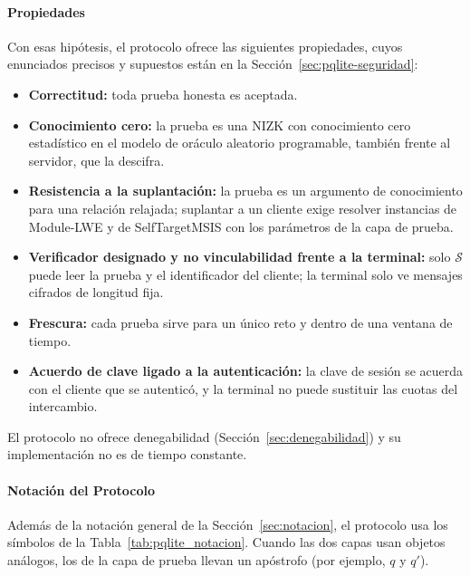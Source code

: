 \paragraph{Propiedades}

Con esas hipótesis, el protocolo ofrece las siguientes propiedades, cuyos enunciados precisos y supuestos están en la Sección~\ref{sec:pqlite-seguridad}:
\begin{itemize}
    \item \textbf{Correctitud:} toda prueba honesta es aceptada.
    \item \textbf{Conocimiento cero:} la prueba es una NIZK con conocimiento cero estadístico en el modelo de oráculo aleatorio programable, también frente al servidor, que la descifra.
    \item \textbf{Resistencia a la suplantación:} la prueba es un argumento de conocimiento para una relación relajada; suplantar a un cliente exige resolver instancias de Module-LWE y de SelfTargetMSIS con los parámetros de la capa de prueba.
    \item \textbf{Verificador designado y no vinculabilidad frente a la terminal:} solo $\mathcal{S}$ puede leer la prueba y el identificador del cliente; la terminal solo ve mensajes cifrados de longitud fija.
    \item \textbf{Frescura:} cada prueba sirve para un único reto y dentro de una ventana de tiempo.
    \item \textbf{Acuerdo de clave ligado a la autenticación:} la clave de sesión se acuerda con el cliente que se autenticó, y la terminal no puede sustituir las cuotas del intercambio.
\end{itemize}
El protocolo no ofrece denegabilidad (Sección~\ref{sec:denegabilidad}) y su implementación no es de tiempo constante.

\paragraph{Notación del Protocolo}
Además de la notación general de la Sección~\ref{sec:notacion}, el protocolo usa los símbolos de la Tabla~\ref{tab:pqlite_notacion}. Cuando las dos capas usan objetos análogos, los de la capa de prueba llevan un apóstrofo (por ejemplo, $q$ y $q'$).

